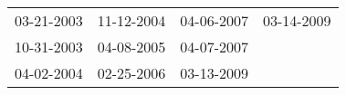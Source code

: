 \begin{supertabular}{llll}
 03-21-2003 &  11-12-2004 &  04-06-2007 &  03-14-2009 \\
 10-31-2003 &  04-08-2005 &  04-07-2007 &             \\
 04-02-2004 &  02-25-2006 &  03-13-2009 &             \\
\end{supertabular}
